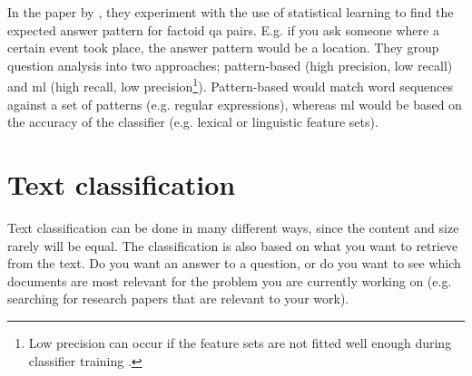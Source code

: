 In the paper by \cite{TobaAdrianiManurung2011}, they experiment with the use of statistical 
learning to find the expected answer pattern for factoid \gls{qa} pairs. E.g. if you ask someone where a certain event took place, the answer pattern would be a location. They group question analysis into two approaches; pattern-based (high precision, low recall) and \gls{ml} (high recall, low precision\footnote{Low precision can occur if the feature sets are not fitted well enough during 
	classifier training \cite[p.~283]{TobaAdrianiManurung2011}.}). Pattern-based would match 
word sequences against a set of patterns (e.g. regular expressions), whereas \gls{ml} would be 
based on the accuracy of the classifier (e.g. lexical or linguistic feature sets). 
\begin{comment}
The retrieval of \gls{qa} pairs is done by using a statistical relation framework: Bayesian 
Analogical Reasoning (BAR). Features sets are then extracted from the training set by use of binary 
values checking if the question contains a given question word. The BAR framework then learns the 
related features and computes the estimation for them. Thereafter \gls{qa} pairs are retrieved from 
the testing set and compared against the training set. Afterwards, the \gls{qa} pairs that have 
identical question words are identified, and overlapping pairs are grouped according their named 
entity group.

To retrieve named entities, they used two different recognizers. The first was Stanford (extracts the
person, organization and location), and the second was dictionary based (extract number
entities and fine-grained noun-based entities). 

Question words were extracted by building a question word list from the training set (achieved 
by using Stanford Part-of-Speech (POS) tagger). Then for each question, look for the appearance 
of the question word to create the feature set.

Mapped named-entities; e.g. ORGANIZATION became NEorganization.

\end{comment}

\cite{XuZhouWang2012}


\section{Text classification}
\label{sec:text_classification}
Text classification can be done in many different ways, since the content and size rarely will be 
equal. The classification is also based on what you want to retrieve from the text. Do you want 
an answer to a question, or do you want to see which documents are most relevant for the problem 
you are currently working on (e.g. searching for research papers that are relevant to your work).

